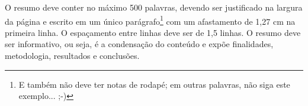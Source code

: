 \begin{resumo}

O resumo deve conter no máximo 500 palavras, devendo ser justificado na largura da página e escrito em um único parágrafo\footnote{E também não deve ter notas de rodapé; em outras palavras, não siga este exemplo... ;-)} com um afastamento de 1,27 cm na primeira linha. O espaçamento entre linhas deve ser de 1,5 linhas. O resumo deve ser informativo, ou seja, é a condensação do conteúdo e expõe finalidades, metodologia, resultados e conclusões.


\end{resumo}
